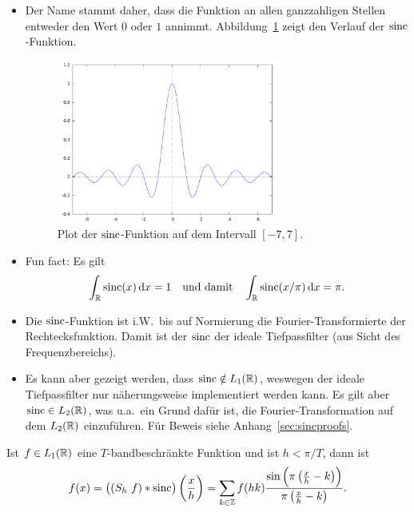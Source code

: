 \begin{remark}\leavevmode
\begin{itemize}
\item Der Name stammt daher, dass die Funktion an allen ganzzahligen Stellen entweder den Wert 
  $ 0 $ oder $ 1 $ annimmt. Abbildung~\ref{fig:sinc} zeigt den Verlauf der $ \operatorname{sinc} $-Funktion.
  \begin{figure}[ht]
  \centering
  \includegraphics[width=0.7\textwidth]{Bilder/sinc}
  \caption{Plot der $ \operatorname{sinc} $-Funktion auf dem Intervall $ [-7,7] $.}
  \label{fig:sinc}
  \end{figure}
\item Fun fact: Es gilt
  \[
    \int_{\R} \sinc(x) \dif x = 1 \quad \text{und damit} \quad
    \int_{\R} \sinc(x / \pi) \dif x = \pi.
  \]
\item Die $ \operatorname{sinc} $-Funktion ist i.W.\ bis auf Normierung die Fourier-Transformierte der
  Rechtecksfunktion. Damit ist der $ \operatorname{sinc} $ der ideale Tiefpassfilter (aus Sicht des
  Frequenzbereichs).
\item Es kann aber gezeigt werden, dass $ \operatorname{sinc} \notin L_{1}(\mathbb{R}) $, weswegen der ideale 
  Tiefpassfilter nur näherungsweise implementiert werden kann. Es gilt aber
  $ \operatorname{sinc} \in L_{2}(\mathbb{R}) $, was u.a.\ ein Grund dafür ist, die Fourier-Transformation auf dem
  $ L_{2}(\mathbb{R}) $ einzuführen. Für Beweis siehe Anhang~\ref{sec:sincproofs}.
\end{itemize}
\end{remark}

\begin{proposition}
Ist $ f \in L_{1}(\mathbb{R}) $ eine $ T $-bandbeschränkte Funktion und ist $ h < \pi / T $, dann ist
\[
  f(x) = \left( (S_{h} \ f) * \operatorname{sinc} \right) \left( \frac{x}{h} \right) 
       = \sum_{k \in \mathbb{Z}} f(hk) 
           \frac{\sin \left( \pi \left( \frac{x}{h} - k \right) \right)}
                {\pi \left( \frac{x}{h} - k \right)}.
\]
\end{proposition}